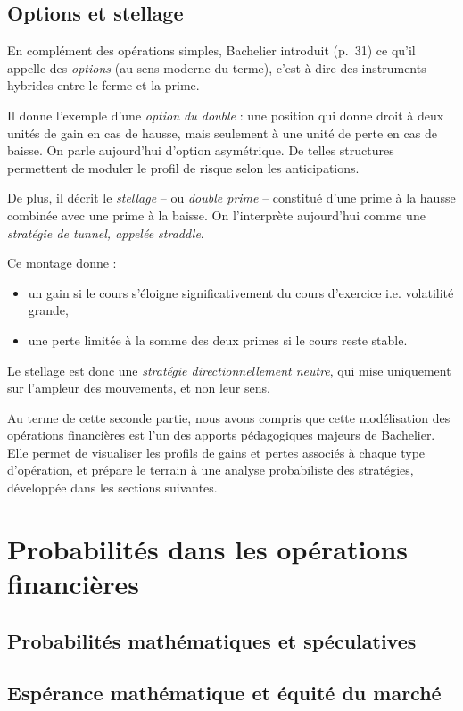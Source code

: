\documentclass[12pt,a4paper]{article}
\begin{document}
\subsection{Options et stellage}

En complément des opérations simples, Bachelier introduit (p.~31) ce qu’il appelle des \textit{options} (au sens moderne du terme), c’est-à-dire des instruments hybrides entre le ferme et la prime.

Il donne l’exemple d’une \textit{option du double} : une position qui donne droit à deux unités de gain en cas de hausse, mais seulement à une unité de perte en cas de baisse. On parle aujourd’hui d’option asymétrique. De telles structures permettent de moduler le profil de risque selon les anticipations.

De plus, il décrit le \textit{stellage} -- ou \textit{double prime} -- constitué d’une prime à la hausse combinée avec une prime à la baisse. On l’interprète aujourd’hui comme une \textit{stratégie de tunnel, appelée straddle}.

Ce montage donne :
\begin{itemize}
  \item un gain si le cours s’éloigne significativement du cours d’exercice i.e. volatilité grande,
  \item une perte limitée à la somme des deux primes si le cours reste stable.
\end{itemize}

Le stellage est donc une \textit{stratégie directionnellement neutre}, qui mise uniquement sur l’ampleur des mouvements, et non leur sens.

\bigskip

\noindent
Au terme de cette seconde partie, nous avons compris que cette modélisation des opérations financières est l’un des apports pédagogiques majeurs de Bachelier. Elle permet de visualiser les profils de gains et pertes associés à chaque type d’opération, et prépare le terrain à une analyse probabiliste des stratégies, développée dans les sections suivantes.

\section{Probabilités dans les opérations financières}
\subsection{Probabilités mathématiques et spéculatives}
\subsection{Espérance mathématique et équité du marché}
\end{document}
